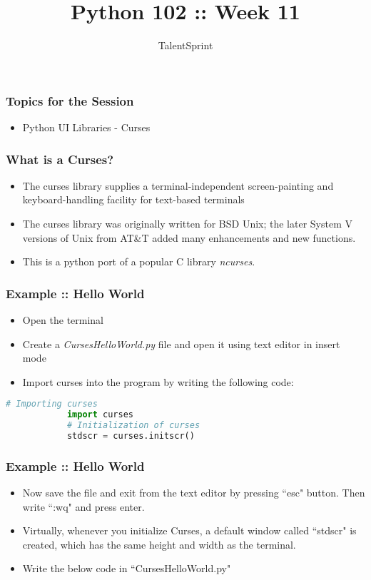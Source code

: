 \documentclass[14pt]{beamer}
\title{Python 102 :: Week 11}
\date{}
\author[TS]{TalentSprint}
\begin{document}
    \begin{frame}
        \titlepage
    \end{frame}
    \begin{frame}   
        \frametitle{Topics for the Session}
        \begin{itemize}
            \item Python UI Libraries - Curses
        \end{itemize}
    \end{frame}
    \begin{frame}
        \frametitle{What is a Curses?}
        \begin{itemize}
            \item The curses library supplies a terminal-independent screen-painting and keyboard-handling facility for text-based terminals
            \item The curses library was originally written for BSD Unix; the later System V versions of Unix from AT\&T added many enhancements and new functions. 
            \item This is a python port of a popular C library \emph{ncurses}.
        \end{itemize}
    \end{frame}
    \begin{frame}[containsverbatim]
        \frametitle{Example :: Hello World}
        \begin{itemize}
            \item Open the terminal
            \item Create a \emph{CursesHelloWorld.py} file and open it using text editor in insert mode
            \item Import curses into the program by writing the following code:
        \end{itemize}
        \begin{lstlisting}[language=Python]
            # Importing curses
            import curses
            # Initialization of curses
            stdscr = curses.initscr() 
        \end{lstlisting}
    \end{frame}
    \begin{frame}
        \frametitle{Example :: Hello World}
        \begin{itemize}
            \item Now save the file and exit from the text editor by pressing ``esc" button. Then write ``:wq" and press enter.
            \item Virtually, whenever you initialize Curses, a default window called ``stdscr" is created, which has the same height and width as the terminal.
            \item Write the below code in ``CursesHelloWorld.py"
        \end{itemize}
    \end{frame}
\end{document}
